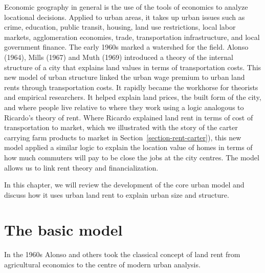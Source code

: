 Economic geography in general is the use of the tools of economics to analyze locational decisions. Applied to urban areas, it takes up urban issues such as crime, education, public transit, housing, land use restrictions, local labor markets, agglomeration economies, trade, transportation infrastructure, and local government finance. %
The early 1960s marked a watershed for the field.  Alonso (1964), Mills (1967) and Muth (1969) introduced a theory of the internal structure of a city that explains land values in terms of transportation costs. %
This new model of urban structure linked the \gls{urban wage premium} to urban land rents through transportation costs.  It rapidly became the workhorse for theorists and empirical researchers. It helped explain land prices, the built form of the city, and where people live relative to where they work using a logic analogous to Ricardo's theory of rent. Where Ricardo explained land rent in terms of cost of transportation to market, which we illustrated with the story of the carter carrying farm products to market in Section~\ref{section-rent-carter}), this new model applied a similar logic to explain the location value of homes in terms of how much commuters will pay to be close the jobs at the city centres. The model allows us to link rent theory and financialization. %

In this chapter, we will review the development of the core urban model and discuss how it uses urban land rent to explain urban size and structure. %

\section{The basic model}
In the 1960s Alonso and others took the classical concept of land rent from agricultural economics to the centre of modern urban analysis.

